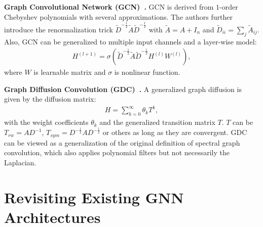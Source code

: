 \documentclass[nohyperref]{article}
\theoremstyle{plain}
\theoremstyle{definition}
\theoremstyle{remark}
\begin{document}
\textbf{Graph Convolutional Network (GCN)~\cite{kipf2017semi}.}
GCN is derived from $1$-order Chebyshev polynomials with several approximations.
The authors further introduce the renormalization trick $\tilde{D}^{-\frac{1}{2}}\tilde{A}\tilde{D}^{-\frac{1}{2}}$ with $\tilde{A}=A+I_n$ and $\tilde{D}_{i i}=\sum_{j}\tilde{A}_{i j}$.
Also, GCN can be generalized to multiple input channels and a layer-wise model:
\begin{equation}
	\label{equ:gcn_conv}
	\begin{aligned}
		H^{(l+1)}=\sigma\left(\tilde{D}^{-\frac{1}{2}}\tilde{A}\tilde{D}^{-\frac{1}{2}}H^{(l)}W^{(l)}\right),
	\end{aligned}
\end{equation}
where $W$ is learnable matrix and $\sigma$ is nonlinear function.

\textbf{Graph Diffusion Convolution (GDC)~\cite{klicpera2019diffusion}.}
A generalized graph diffusion is given by the diffusion matrix:
\begin{equation}
	\label{equ:gdc_conv}
	\begin{aligned}
		H=\sum_{k=0}^{\infty} \theta_k T^k,
	\end{aligned}
\end{equation}
with the weight coefficients $\theta_k$ and the generalized transition matrix $T$.
$T$ can be $T_{rw}=AD^{-1}$, $T_{sym}=D^{-\frac{1}{2}}AD^{-\frac{1}{2}}$ or others as long as they are convergent.
GDC can be viewed as a generalization of the original definition of spectral graph convolution, which also applies polynomial filters but not necessarily the Laplacian.


\section{Revisiting Existing GNN Architectures}
\end{document}
